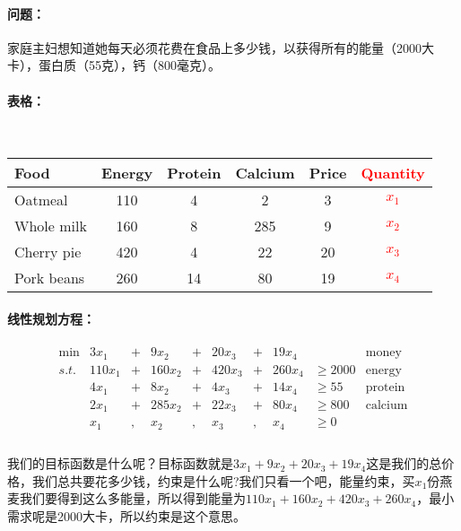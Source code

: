         \paragraph{问题：}家庭主妇想知道她每天必须花费在食品上多少钱，以获得所有的能量（2000大卡），蛋白质（55克），钙（800毫克）。
        \paragraph{表格：}
        \ \\
        		\begin{table}[h]
        			\centering
					\begin{tabular}{l|ccc|c|c}			
					\hline
      		 			Food & Energy & Protein & Calcium  & Price & \textcolor{red}{Quantity}\\
 					\hline
 						Oatmeal & 110 & 4 & 2 & 3 & \textcolor{red}{$x_1$}\\
 						Whole milk & 160 & 8 & 285 & 9 & \textcolor{red}{$x_2$}\\
 						Cherry pie & 420 & 4 & 22 & 20 & \textcolor{red}{$x_3$}\\
 						Pork beans & 260 & 14 & 80 & 19 & \textcolor{red}{$x_4$}\\
					\hline
     				\end{tabular}
		 		\end{table}
        	
        \paragraph{线性规划方程：}
        \[
			\begin{array}{rrrrrrrrlr}
			 \min & 3x_1   &+& 9 x_2   &+& 20x_3   &+& 19x_4   & & \text{money}\\
 			s.t. & 110x_1 &+& 160 x_2 &+& 420 x_3 &+& 260 x_4 & \geq 2000 & \text{energy} \\
     		 & 4 x_1  &+& 8 x_2   &+& 4 x_3   &+& 14 x_4  & \geq 55 & \text{protein}\\
     			 &  2 x_1 &+& 285 x_2 &+& 22 x_3  &+& 80 x_4  & \geq 800 & \text{calcium}\\
     		 & x_1    &,& x_2     &,& x_3     &,&    x_4  & \geq 0 \\ 		
			\end{array} \nonumber
		\] 
		
		\paragraph{}我们的目标函数是什么呢？目标函数就是$3x_1+9x_2 + 20x_3   +19x_4$这是我们的总价格，我们总共要花多少钱，约束是什么呢?我们只看一个吧，能量约束，买$x_1$份燕麦我们要得到这么多能量，所以得到能量为$110x_1 + 160 x_2 + 420 x_3 + 260 x_4$，最小需求呢是2000大卡，所以约束是这个意思。
		
